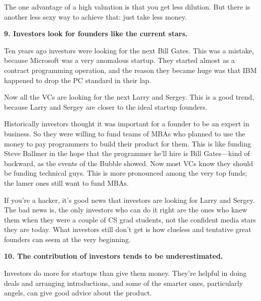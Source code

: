 The
                  one advantage of a high valuation is that you get less
                  dilution. But there is another less sexy way to achieve that:
                  just take less money.

\textbf{9. Investors look for founders like the current stars.}

Ten years ago investors were looking for the next
                  Bill Gates. This was a mistake, because Microsoft was a very
                  anomalous startup. They started almost as a contract
                  programming operation, and the reason they became huge was
                  that IBM happened to drop the PC standard in their lap.

Now
                  all the VCs are looking for the next Larry and Sergey. This is
                  a good trend, because Larry and Sergey are closer to the ideal
                  startup founders.

Historically investors thought it
                  was important for a founder to be an expert in business. So
                  they were willing to fund teams of MBAs who planned to use the
                  money to pay programmers to build their product for them. This
                  is like funding Steve Ballmer in the hope that the programmer
                  he'll hire is Bill Gates---kind of backward, as the events
                  of the Bubble showed. Now most VCs know they should be funding
                  technical guys. This is more pronounced among the very top
                  funds; the lamer ones still want to fund MBAs.

If
                  you're a hacker, it's good news that investors are looking for
                  Larry and Sergey. The bad news is, the only investors who can
                  do it right are the ones who knew them when they were a couple
                  of CS grad students, not the confident media stars they are
                  today. What investors still don't get is how clueless and
                  tentative great founders can seem at the very beginning.

\textbf{10. The contribution of investors tends to be
                    underestimated.}

Investors do more for startups than give them
                  money. They're helpful in doing deals and arranging
                  introductions, and some of the smarter ones, particularly
                  angels, can give good advice about the product.

